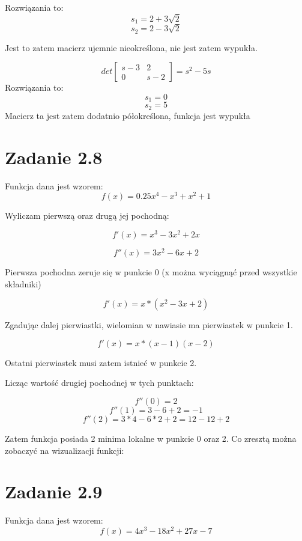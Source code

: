 \documentclass[paper=a4, fontsize=11pt]{scrartcl} %
\begin{document}
Rozwiązania to:
\[s_1=2+3\sqrt{2}\]
\[s_2=2-3\sqrt{2}\]

Jest to zatem macierz ujemnie nieokreślona, nie jest zatem wypukła.

\[
det\begin{bmatrix}
  s-3 & 2 \\
  0 & s-2 
\end{bmatrix}
= s^2 -5s
\]
Rozwiązania to:
\[s_1=0\]
\[s_2=5\]
Macierz ta jest zatem dodatnio półokreślona, funkcja jest wypukła
\newpage
\section{Zadanie 2.8}

Funkcja dana jest wzorem:
\[f(x)=0.25x^4-x^3+x^2+1\]

Wyliczam pierwszą oraz drugą jej pochodną:

\[f'(x)=x^3-3x^2+2x\]

\[f''(x)=3x^2-6x+2\]

Pierwsza pochodna zeruje się w punkcie 0 (x można wyciągnąć przed wszystkie składniki)


\[f'(x)=x*(x^2-3x+2)\]

Zgadując dalej pierwiastki, wielomian w nawiasie ma pierwiastek w punkcie 1.


\[f'(x)=x*(x-1)(x-2)\]

Ostatni pierwiastek musi zatem istnieć w punkcie 2.

Licząc wartość drugiej pochodnej w tych punktach:

\[f''(0)=2\]
\[f''(1)=3-6+2=-1\]
\[f''(2)=3*4-6*2+2=12-12+2\]

Zatem funkcja posiada 2 minima lokalne w punkcie 0 oraz 2. Co zresztą można zobaczyć na wizualizacji funkcji: \\


\newpage


\section{Zadanie 2.9}


Funkcja dana jest wzorem:
\[f(x)=4x^3-18x^2+27x-7\]
\end{document}
